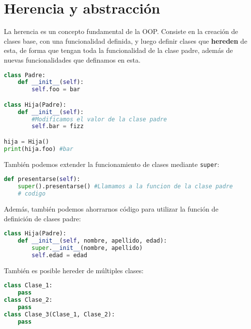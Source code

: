 \documentclass{./Programacion.tex}
\begin{document}
\section{Herencia y abstracción}
La herencia es un concepto fundamental de la OOP\@. Consiste en la creación de clases base, con una funcionalidad definida, y luego definir clases que \textbf{hereden} de esta, de forma que tengan toda la funcionalidad de la clase padre, además de nuevas funcionalidades que definamos en esta.
\begin{lstlisting}[language=python]
class Padre:
	def __init__(self):
		self.foo = bar

class Hija(Padre):
	def __init__(self):
		#Modificamos el valor de la clase padre
		self.bar = fizz

hija = Hija()
print(hija.foo) #bar
\end{lstlisting}
También podemos extender la funcionamiento de clases mediante \verb|super|:
\begin{lstlisting}[language=python]
def presentarse(self):
	super().presentarse() #Llamamos a la funcion de la clase padre
	# codigo
\end{lstlisting}
Además, también podemos ahorrarnos código para utilizar la función de definición de clases padre:
\begin{lstlisting}[language=python]
class Hija(Padre):
	def __init__(self, nombre, apellido, edad):
		super.__init__(nombre, apellido)
		self.edad = edad
\end{lstlisting}
También es posible hereder de múltiples clases:
\begin{lstlisting}[language=python]
class Clase_1:
	pass
class Clase_2:
	pass
class Clase_3(Clase_1, Clase_2):
	pass
\end{lstlisting}
\pagebreak
\end{document}
